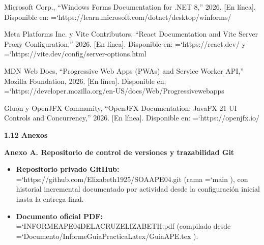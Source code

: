\documentclass[11pt,a4paper]{article}
\renewcommand{\_}{\oldunderscore\allowbreak}
\DeclareRobustCommand{\texttt}[1]{%
  {\upshape\ttfamily\fontsize{9}{10.8}\selectfont\hyphenchar\font=`\-\relax #1}%
}
\begin{document}
\begin{enumerate}[label={[\arabic*]},leftmargin=*,itemsep=3pt,topsep=2pt]
  \item Microsoft Corp., ``Windows Forms Documentation for .NET 8,'' 2026. [En línea]. Disponible en: \texttt{https:\allowbreak{}/\allowbreak{}/\allowbreak{}learn.\allowbreak{}microsoft.\allowbreak{}com/\allowbreak{}dotnet/\allowbreak{}desktop/\allowbreak{}winforms/}
  \item Meta Platforms Inc. y Vite Contributors, ``React Documentation and Vite Server Proxy Configuration,'' 2026. [En línea]. Disponible en: \texttt{https:\allowbreak{}/\allowbreak{}/\allowbreak{}react.\allowbreak{}dev/} y \texttt{https:\allowbreak{}/\allowbreak{}/\allowbreak{}vite.\allowbreak{}dev/\allowbreak{}config/\allowbreak{}server-options.\allowbreak{}html}
  \item MDN Web Docs, ``Progressive Web Apps (PWAs) and Service Worker API,'' Mozilla Foundation, 2026. [En línea]. Disponible en: \texttt{https:\allowbreak{}/\allowbreak{}/\allowbreak{}developer.\allowbreak{}mozilla.\allowbreak{}org/\allowbreak{}en-US/\allowbreak{}docs/\allowbreak{}Web/\allowbreak{}Progressive\_web\_apps}
  \item Gluon y OpenJFX Community, ``OpenJFX Documentation: JavaFX 21 UI Controls and Concurrency,'' 2026. [En línea]. Disponible en: \texttt{https:\allowbreak{}/\allowbreak{}/\allowbreak{}openjfx.\allowbreak{}io/}
\end{enumerate}

\vspace{0.2cm}

\noindent\textbf{1.12 Anexos}

\vspace{0.1cm}
\noindent\textbf{Anexo A. Repositorio de control de versiones y trazabilidad Git}
\begin{itemize}[leftmargin=*,itemsep=2pt,topsep=1pt]
  \item \textbf{Repositorio privado GitHub:} \texttt{https:\allowbreak{}/\allowbreak{}/\allowbreak{}github.\allowbreak{}com/\allowbreak{}Elizabeth1925/\allowbreak{}SOA\_APE04.\allowbreak{}git} (rama \texttt{main}), con historial incremental documentado por actividad desde la configuración inicial hasta la entrega final.
  \item \textbf{Documento oficial PDF:} \texttt{INFORME\_APE04\_DELACRUZ\_ELIZABETH.\allowbreak{}pdf} (compilado desde \texttt{Documento/\allowbreak{}Informe\_Guia\_Practica\_4\_Latex/\allowbreak{}Guia\_APE\_04.\allowbreak{}tex}).
\end{itemize}
\end{document}
